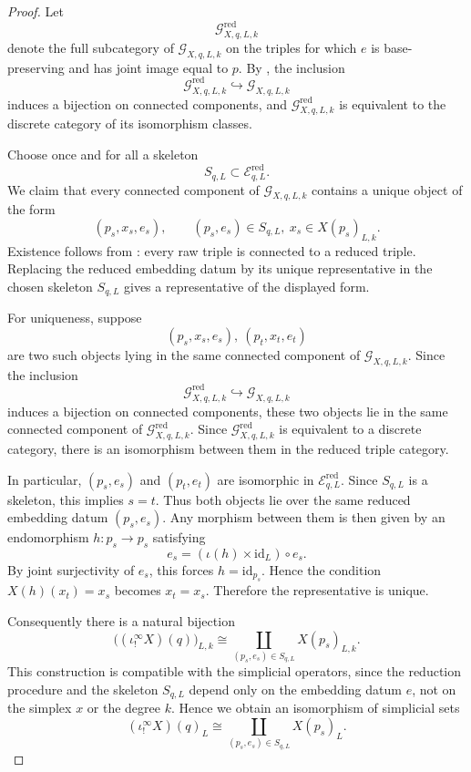 \documentclass{amsart}
\newcommand{\id}{\mathrm{id}}
\theoremstyle{definition}
\numberwithin{equation}{subsection}
\numberwithin{subsubsection}{subsection}
\begin{document}
\begin{proof}
  Let
  \[
    \mathcal{G}^{\mathrm{red}}_{X,q,L,k}
  \]
  denote the full subcategory of \(\mathcal{G}_{X,q,L,k}\) on the triples for
  which \(e\) is base-preserving and has joint image equal to \(p\). By
  , the inclusion
  \[
    \mathcal{G}^{\mathrm{red}}_{X,q,L,k}
    \hookrightarrow
    \mathcal{G}_{X,q,L,k}
  \]
  induces a bijection on connected components, and
  \(\mathcal{G}^{\mathrm{red}}_{X,q,L,k}\) is equivalent to the discrete
  category of its isomorphism classes.

  Choose once and for all a skeleton
  \[
    S_{q,L}\subset \mathcal{E}^{\mathrm{red}}_{q,L}.
  \]
  We claim that every connected component of \(\mathcal{G}_{X,q,L,k}\) contains
  a unique object of the form
  \[
    (p_s,x_s,e_s),
    \qquad
    (p_s,e_s)\in S_{q,L},\ x_s\in X(p_s)_{L,k}.
  \]
  Existence follows from : every raw
  triple is connected to a reduced triple. Replacing the reduced embedding
  datum by its unique representative in the chosen skeleton \(S_{q,L}\) gives
  a representative of the displayed form.

  For uniqueness, suppose
  \[
    (p_s,x_s,e_s),\ (p_t,x_t,e_t)
  \]
  are two such objects lying in the same connected component of
  \(\mathcal{G}_{X,q,L,k}\). Since the inclusion
  \[
    \mathcal{G}^{\mathrm{red}}_{X,q,L,k}
    \hookrightarrow
    \mathcal{G}_{X,q,L,k}
  \]
  induces a bijection on connected components, these two objects lie in the
  same connected component of \(\mathcal{G}^{\mathrm{red}}_{X,q,L,k}\). Since
  \(\mathcal{G}^{\mathrm{red}}_{X,q,L,k}\) is equivalent to a discrete
  category, there is an isomorphism between them in the reduced triple
  category.

  In particular, \((p_s,e_s)\) and \((p_t,e_t)\) are isomorphic in
  \(\mathcal{E}^{\mathrm{red}}_{q,L}\). Since \(S_{q,L}\) is a skeleton, this
  implies \(s=t\). Thus both objects lie over the same reduced embedding datum
  \((p_s,e_s)\). Any morphism between them is then given by an endomorphism
  \(h:p_s\to p_s\) satisfying
  \[
    e_s=(\iota(h)\times \id_L)\circ e_s.
  \]
  By joint surjectivity of \(e_s\), this forces \(h=\id_{p_s}\). Hence the
  condition \(X(h)(x_t)=x_s\) becomes \(x_t=x_s\). Therefore the representative
  is unique.

  Consequently there is a natural bijection
  \[
    \bigl((\iota_{!}^{\infty}X)(q)\bigr)_{L,k}
    \cong
    \coprod_{(p_s,e_s)\in S_{q,L}} X(p_s)_{L,k}.
  \]
  This construction is compatible with the simplicial operators, since the
  reduction procedure and the skeleton \(S_{q,L}\) depend only on the embedding
  datum \(e\), not on the simplex \(x\) or the degree \(k\). Hence we obtain an
  isomorphism of simplicial sets
  \[
    (\iota_{!}^{\infty}X)(q)_L
    \cong
    \coprod_{(p_s,e_s)\in S_{q,L}} X(p_s)_L.
  \]


\end{proof}
\end{document}
